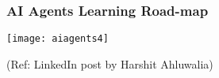 \begin{frame}[fragile]\frametitle{AI Agents Learning Road-map}
		\begin{center}
		\texttt{[image: aiagents4]}
		
		{\tiny (Ref: LinkedIn post by Harshit Ahluwalia)}
		
		\end{center}
		
\end{frame}